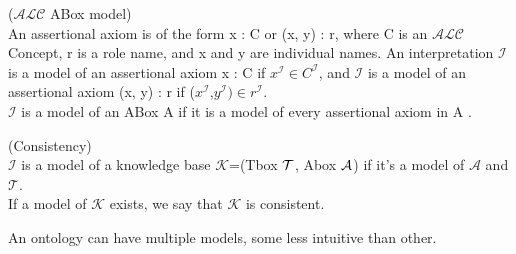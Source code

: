 \begin{mydef}\label{ALCAbox} \cite{handbook2} ($\mathcal{ALC}$ ABox model) \\
An assertional axiom is of the form x : C or (x, y) : r, where C is
an $\mathcal{ALC}$ Concept, r is a role name, and x and y are individual names.  
An interpretation $\mathcal{I}$ is a model of an assertional 
axiom x : C if $x^\mathcal{I} \in C^\mathcal{I}$, and $\mathcal{I}$ is a model of an assertional axiom (x, y) : r if
($x^\mathcal{I}$,$y^\mathcal{I}) \in r^\mathcal{I}$.\\ $\mathcal{I}$ is a model of an ABox A if it is a model of every assertional axiom in A . \\
\end{mydef}
\begin{mydef}\label{consistency} \cite{handbook2} (Consistency)\\
$\mathcal{I}$ is a model of a knowledge base  $\mathcal{K}$=(Tbox $\mathcal{T}$, Abox $\mathcal{A}$) if it's a model of $\mathcal{A}$ and $\mathcal{T}$. \\
If a model of $\mathcal{K}$ exists, we say that $\mathcal{K}$ is consistent.
\end{mydef}

An ontology can have multiple models, some less intuitive than other.

